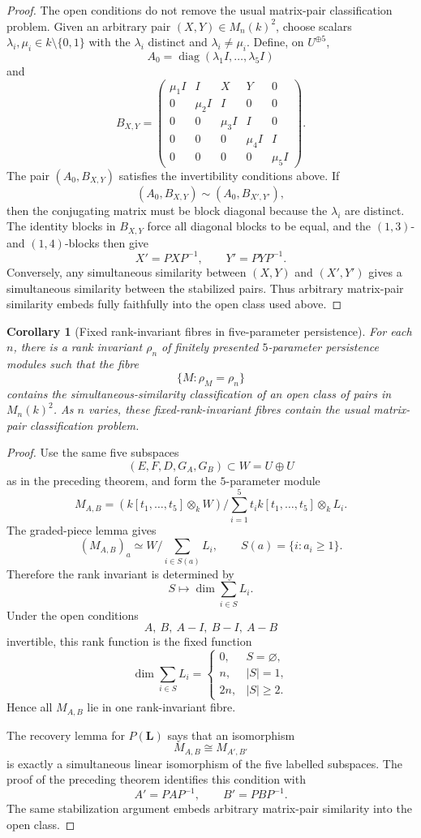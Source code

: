 \documentclass[11pt]{article}
\newtheorem{corollary}[theorem]{Corollary}
\begin{document}
\begin{proof}
The open conditions do not remove the usual matrix-pair classification problem. Given an arbitrary pair \((X,Y)\in M_n(k)^2\), choose scalars \(\lambda_i,\mu_i\in k\setminus\{0,1\}\) with the \(\lambda_i\) distinct and \(\lambda_i\neq\mu_i\). Define, on \(U^{\oplus5}\),
\[
A_0=\operatorname{diag}(\lambda_1I,\ldots,\lambda_5I)
\]
and
\[
B_{X,Y}=
\begin{pmatrix}
\mu_1I&I&X&Y&0\\
0&\mu_2I&I&0&0\\
0&0&\mu_3I&I&0\\
0&0&0&\mu_4I&I\\
0&0&0&0&\mu_5I
\end{pmatrix}.
\]
The pair \((A_0,B_{X,Y})\) satisfies the invertibility conditions above. If
\[
(A_0,B_{X,Y})\sim(A_0,B_{X',Y'}),
\]
then the conjugating matrix must be block diagonal because the \(\lambda_i\) are distinct. The identity blocks in \(B_{X,Y}\) force all diagonal blocks to be equal, and the \((1,3)\)- and \((1,4)\)-blocks then give
\[
X'=PXP^{-1},
\qquad
Y'=PYP^{-1}.
\]
Conversely, any simultaneous similarity between \((X,Y)\) and \((X',Y')\) gives a simultaneous similarity between the stabilized pairs. Thus arbitrary matrix-pair similarity embeds fully faithfully into the open class used above.
\end{proof}

\begin{corollary}[Fixed rank-invariant fibres in five-parameter persistence]
For each \(n\), there is a rank invariant \(\rho_n\) of finitely presented \(5\)-parameter persistence modules such that the fibre
\[
\{M:\rho_M=\rho_n\}
\]
contains the simultaneous-similarity classification of an open class of pairs in \(M_n(k)^2\). As \(n\) varies, these fixed-rank-invariant fibres contain the usual matrix-pair classification problem.
\end{corollary}

\begin{proof}
Use the same five subspaces
\[
(E,F,D,G_A,G_B)\subset W=U\oplus U
\]
as in the preceding theorem, and form the \(5\)-parameter module
\[
M_{A,B}
=
(k[t_1,\ldots,t_5]\otimes_k W)
\Big/
\sum_{i=1}^5 t_i k[t_1,\ldots,t_5]\otimes_k L_i.
\]
The graded-piece lemma gives
\[
(M_{A,B})_a\simeq
W\Big/\sum_{i\in S(a)}L_i,
\qquad
S(a)=\{i:a_i\geq1\}.
\]
Therefore the rank invariant is determined by
\[
S\mapsto\dim\sum_{i\in S}L_i.
\]
Under the open conditions
\[
A,\ B,\ A-I,\ B-I,\ A-B
\]
invertible, this rank function is the fixed function
\[
\dim\sum_{i\in S}L_i=
\begin{cases}
0,&S=\varnothing,\\
n,&|S|=1,\\
2n,&|S|\geq2.
\end{cases}
\]
Hence all \(M_{A,B}\) lie in one rank-invariant fibre.

The recovery lemma for \(P(\mathbf L)\) says that an isomorphism
\[
M_{A,B}\cong M_{A',B'}
\]
is exactly a simultaneous linear isomorphism of the five labelled subspaces. The proof of the preceding theorem identifies this condition with
\[
A'=PAP^{-1},
\qquad
B'=PBP^{-1}.
\]
The same stabilization argument embeds arbitrary matrix-pair similarity into the open class.
\end{proof}
\end{document}
